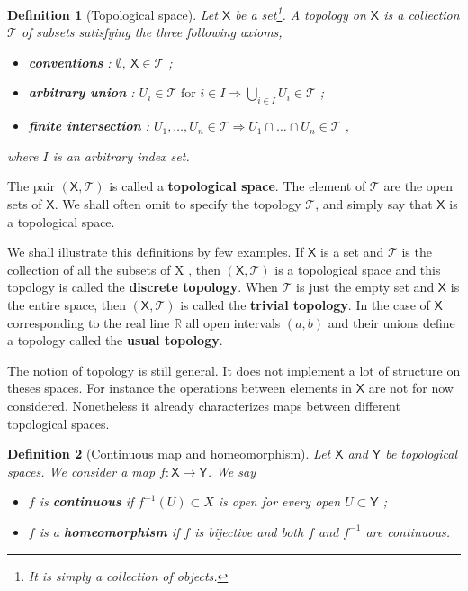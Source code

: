 \documentclass[11pt]{book}
\newcommand{\Tcal}{\mathcal{T}}
\newcommand{\Rbb}{\mathbb{R}}
\newcommand{\Xsf}{\mathsf{X}}
\newcommand{\Ysf}{\mathsf{Y}}
\theoremstyle{break}
\newtheorem{definition}{Definition}[chapter]
\begin{document}
\begin{definition}[Topological space] 
Let $\Xsf$ be a set\footnote{It is simply a collection of objects.}. A topology on $\Xsf$ is a collection $\Tcal$ of subsets satisfying the three following axioms,%
%
\begin{itemize}
\item \textbf{conventions} : $\emptyset , \ \Xsf \in \Tcal$ ;
\item \textbf{arbitrary union} : $U_i \in \Tcal \mbox{ for } i \in I \Longrightarrow \bigcup_{i\in I} U_i \in \Tcal$ ;
\item \textbf{finite intersection} : $U_1 , \dots , U_n \in \Tcal \Longrightarrow U_1 \cap \dots \cap U_n \in \Tcal$ ,
\end{itemize}
%
where $I$ is an arbitrary index set.
\end{definition}
%
The pair $(\Xsf,\Tcal)$ is called a \textbf{topological space}. The element of $\Tcal$ are the open sets of $\Xsf$. We shall often omit to specify the topology $\Tcal$, and simply say that $\Xsf$ is a topological space. 


\bigskip


We shall illustrate this definitions by few examples. If $\Xsf$ is a set and $\Tcal$ is the collection of all the subsets of X , then $(\Xsf,\Tcal)$ is a topological space and this topology is called the \textbf{discrete topology}. When $\Tcal$ is just the empty set and $\Xsf$ is the entire space, then $(\Xsf,\Tcal)$ is called the \textbf{trivial topology}. In the case of $\Xsf$ corresponding to the real line $\Rbb$ all open intervals $(a,b)$ and their unions define a topology called the \textbf{usual topology}. 


\bigskip


The notion of topology is still general. It does not implement a lot of structure on theses spaces. For instance the operations between elements in $\Xsf$ are not for now considered. Nonetheless it already characterizes maps between different topological spaces.


\begin{definition}[Continuous map and homeomorphism]
%
Let $\Xsf$ and $\Ysf$ be topological spaces. We consider a map $f : \Xsf \to \Ysf$. We say
%
\begin{itemize}
\item $f$ is \textbf{continuous} if $f^{-1}(U) \subset X$ is open for every open $U \subset\Ysf$ ;
\item $f$ is a \textbf{homeomorphism} if $f$ is bijective and both $f$ and $f^{-1}$ are continuous.
\end{itemize}
%
\end{definition}
\end{document}
